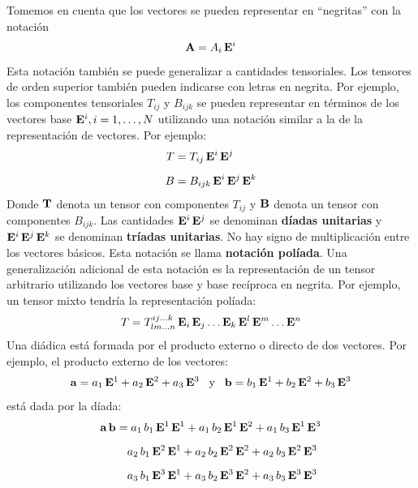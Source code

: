 \documentclass[hidelinks,12pt]{article}
\begin{document}
Tomemos en cuenta que los vectores se pueden representar en \enquote{negritas} con la notación
\begin{align*}
\vb{A} = A_{i} \, \vb{E}^{i}
\end{align*}
Esta notación también se puede generalizar a cantidades tensoriales. Los tensores de orden superior también pueden indicarse con letras en negrita. Por ejemplo, los componentes tensoriales $T_{ij}$ y $B_{ijk}$ se pueden representar en términos de los vectores base $\vb{E}^{i}, i = 1, \ldots, N$ utilizando una notación similar a la de la representación de vectores. Por ejemplo:
\begin{align*}
T &= T_{ij} \, \vb{E}^{i} \, \vb{E}^{j} \\[0.5em]
B &= B_{ijk} \, \vb{E}^{i} \, \vb{E}^{j} \, \vb{E}^{k}
\end{align*}
Donde $\vb{T}$ denota un tensor con componentes $T_{ij}$ y $\vb{B}$ denota un tensor con componentes $B_{ijk}$. Las cantidades $\vb{E}^{i} \, \vb{E}^{j}$ se denominan \textbf{díadas unitarias} y $\vb{E}^{i} \, \vb{E}^{j} \, \vb{E}^{k}$ se denominan \textbf{tríadas unitarias}. No hay signo de multiplicación entre los vectores básicos. Esta notación se llama \textbf{notación políada}. Una generalización adicional de esta notación es la representación de un tensor arbitrario utilizando los vectores base y base recíproca en negrita. Por ejemplo, un tensor mixto tendría la representación políada:
\begin{align*}
T = T_{l m \ldots n}^{i j \ldots k} \, \vb{E}_{i} \, \vb{E}_{j} \ldots \vb{E}_{k} \, \vb{E}^{l} \, \vb{E}^{m} \ldots \vb{E}^{n}
\end{align*}
Una diádica está formada por el producto externo o directo de dos vectores. Por ejemplo, el producto externo de los vectores:
\begin{align*}
\vb{a} = a_{1} \, \vb{E}^{1} + a_{2} \, \vb{E}^{2} + a_{3} \, \vb{E}^{3} \hspace{0.3cm} \text{y} \hspace{0.3cm} \vb{b} = b_{1} \, \vb{E}^{1} + b_{2} \, \vb{E}^{2} + b_{3} \, \vb{E}^{3}
\end{align*}
está dada por la díada:
\begin{align*}
\vb{a} \, \vb{b} &= a_{1} \, b_{1} \, \vb{E}^{1} \, \vb{E}^{1} + a_{1} \, b_{2} \, \vb{E}^{1} \, \vb{E}^{2} + a_{1} \, b_{3} \, \vb{E}^{1} \, \vb{E}^{3} \\[0.5em]  
&{\quad} a_{2} \, b_{1} \, \vb{E}^{2} \, \vb{E}^{1} + a_{2} \, b_{2} \, \vb{E}^{2} \, \vb{E}^{2} + a_{2} \, b_{3} \, \vb{E}^{2} \, \vb{E}^{3} \\[0.5em]
&{\quad} a_{3} \, b_{1} \, \vb{E}^{3} \, \vb{E}^{1} + a_{3} \, b_{2} \, \vb{E}^{3} \, \vb{E}^{2} + a_{3} \, b_{3} \, \vb{E}^{3} \, \vb{E}^{3}
\end{align*}
\end{document}
